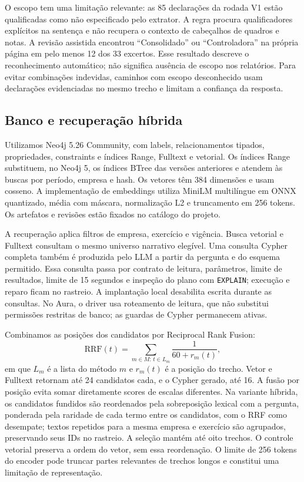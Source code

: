 \documentclass[conference]{IEEEtran}
\begin{document}
O escopo tem uma limitação relevante: as 85 declarações da rodada V1 estão qualificadas como não especificado pelo extrator. A regra procura qualificadores explícitos na sentença e não recupera o contexto de cabeçalhos de quadros e notas. A revisão assistida encontrou ``Consolidado'' ou ``Controladora'' na própria página em pelo menos 12 dos 33 excertos. Esse resultado descreve o reconhecimento automático; não significa ausência de escopo nos relatórios. Para evitar combinações indevidas, caminhos com escopo desconhecido usam declarações evidenciadas no mesmo trecho e limitam a confiança da resposta.

\subsection{Banco e recuperação híbrida}

Utilizamos Neo4j 5.26 Community, com labels, relacionamentos tipados, propriedades, constraints e índices Range, Fulltext e vetorial. Os índices Range substituem, no Neo4j 5, os índices BTree das versões anteriores e atendem às buscas por período, empresa e hash. Os vetores têm 384 dimensões e usam cosseno. A implementação de embeddings utiliza MiniLM multilíngue em ONNX quantizado, média com máscara, normalização L2 e truncamento em 256 tokens. Os artefatos e revisões estão fixados no catálogo do projeto.

A recuperação aplica filtros de empresa, exercício e vigência. Busca vetorial e Fulltext consultam o mesmo universo narrativo elegível. Uma consulta Cypher completa também é produzida pelo LLM a partir da pergunta e do esquema permitido. Essa consulta passa por contrato de leitura, parâmetros, limite de resultados, limite de 15 segundos e inspeção do plano com \texttt{EXPLAIN}; execução e reparo ficam no rastreio. A implantação local desabilita escrita durante as consultas. No Aura, o driver usa roteamento de leitura, que não substitui permissões restritas de banco; as guardas de Cypher permanecem ativas.

Combinamos as posições dos candidatos por Reciprocal Rank Fusion:
\begin{equation}
\mathrm{RRF}(t) = \sum_{m \in M:\, t \in L_m} \frac{1}{60 + r_m(t)},
\end{equation}
em que $L_m$ é a lista do método $m$ e $r_m(t)$ é a posição do trecho. Vetor e Fulltext retornam até 24 candidatos cada, e o Cypher gerado, até 16. A fusão por posição evita somar diretamente scores de escalas diferentes. Na variante híbrida, os candidatos fundidos são reordenados pela sobreposição lexical com a pergunta, ponderada pela raridade de cada termo entre os candidatos, com o RRF como desempate; textos repetidos para a mesma empresa e exercício são agrupados, preservando seus IDs no rastreio. A seleção mantém até oito trechos. O controle vetorial preserva a ordem do vetor, sem essa reordenação. O limite de 256 tokens do encoder pode truncar partes relevantes de trechos longos e constitui uma limitação de representação.
\end{document}
